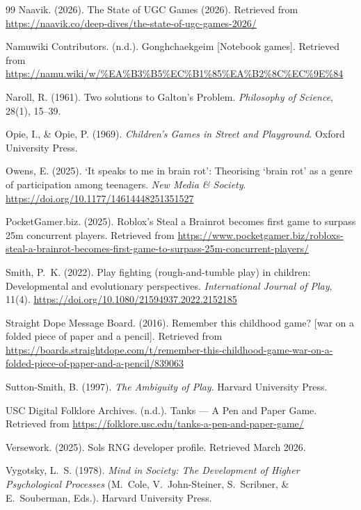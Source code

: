 \documentclass[12pt]{article}
\begin{document}
\begin{thebibliography}{99}
Naavik. (2026).
\newblock The State of UGC Games (2026).
\newblock Retrieved from \url{https://naavik.co/deep-dives/the-state-of-ugc-games-2026/}

Namuwiki Contributors. (n.d.).
\newblock Gonghchaekgeim [Notebook games].
\newblock Retrieved from \url{https://namu.wiki/w/\%EA\%B3\%B5\%EC\%B1\%85\%EA\%B2\%8C\%EC\%9E\%84}

Naroll, R. (1961).
\newblock Two solutions to Galton's Problem.
\newblock \emph{Philosophy of Science}, 28(1), 15--39.

Opie, I., \& Opie, P. (1969).
\newblock \emph{Children's Games in Street and Playground}.
\newblock Oxford University Press.

Owens, E. (2025).
\newblock `It speaks to me in brain rot': Theorising `brain rot' as a genre of participation among teenagers.
\newblock \emph{New Media \& Society}.
\newblock \url{https://doi.org/10.1177/14614448251351527}

PocketGamer.biz. (2025).
\newblock Roblox's Steal a Brainrot becomes first game to surpass 25m concurrent players.
\newblock Retrieved from \url{https://www.pocketgamer.biz/robloxs-steal-a-brainrot-becomes-first-game-to-surpass-25m-concurrent-players/}

Smith, P.~K. (2022).
\newblock Play fighting (rough-and-tumble play) in children: Developmental and evolutionary perspectives.
\newblock \emph{International Journal of Play}, 11(4).
\newblock \url{https://doi.org/10.1080/21594937.2022.2152185}

Straight Dope Message Board. (2016).
\newblock Remember this childhood game? [war on a folded piece of paper and a pencil].
\newblock Retrieved from \url{https://boards.straightdope.com/t/remember-this-childhood-game-war-on-a-folded-piece-of-paper-and-a-pencil/839063}

Sutton-Smith, B. (1997).
\newblock \emph{The Ambiguity of Play}.
\newblock Harvard University Press.

USC Digital Folklore Archives. (n.d.).
\newblock Tanks --- A Pen and Paper Game.
\newblock Retrieved from \url{https://folklore.usc.edu/tanks-a-pen-and-paper-game/}

Versework. (2025).
\newblock Sols RNG developer profile.
\newblock Retrieved March 2026.

Vygotsky, L.~S. (1978).
\newblock \emph{Mind in Society: The Development of Higher Psychological Processes} (M.~Cole, V.~John-Steiner, S.~Scribner, \& E.~Souberman, Eds.).
\newblock Harvard University Press.

\end{thebibliography}
\end{document}
